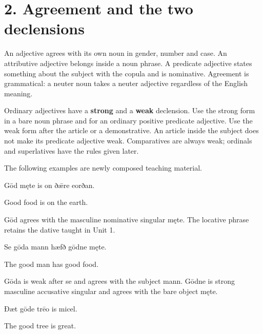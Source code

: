 \section*{2. Agreement and the two declensions}

An adjective agrees with its own noun in gender, number and case. An attributive adjective belongs inside a noun phrase. A predicate adjective states something about the subject with the copula and is nominative. Agreement is grammatical: a neuter noun takes a neuter adjective regardless of the English meaning.

Ordinary adjectives have a \textbf{strong} and a \textbf{weak} declension. Use the strong form in a bare noun phrase and for an ordinary positive predicate adjective. Use the weak form after the article or a demonstrative. An article inside the subject does not make its predicate adjective weak. Comparatives are always weak; ordinals and superlatives have the rules given later.

The following examples are newly composed teaching material.

Gōd męte is on ðǣre eorðan.

Good food is on the earth.

Gōd agrees with the masculine nominative singular męte. The locative phrase retains the dative taught in Unit 1.

Se gōda mann hæfð gōdne męte.

The good man has good food.

Gōda is weak after se and agrees with the subject mann. Gōdne is strong masculine accusative singular and agrees with the bare object męte.

Ðæt gōde trēo is micel.

The good tree is great.


